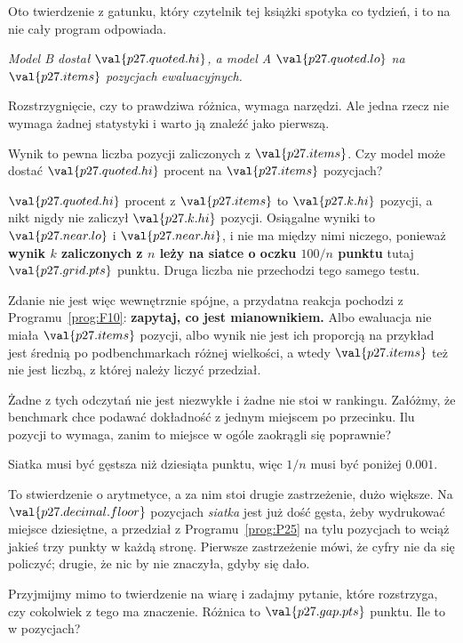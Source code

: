 \begin{fr}
Oto twierdzenie z gatunku, który czytelnik tej książki spotyka co tydzień, i
to na nie cały program odpowiada.

\begin{center}
\emph{Model B dostał $\val{p27.quoted.hi}$, a model A
$\val{p27.quoted.lo}$ na $\val{p27.items}$ pozycjach ewaluacyjnych.}
\end{center}

Rozstrzygnięcie, czy to prawdziwa różnica, wymaga narzędzi. Ale jedna rzecz
nie wymaga żadnej statystyki i warto ją znaleźć jako pierwszą.

Wynik to pewna liczba pozycji zaliczonych z $\val{p27.items}$. Czy model może
dostać $\val{p27.quoted.hi}$ procent na $\val{p27.items}$ pozycjach?
\dotline
\nextframe
\end{fr}

\begin{fr}

$\val{p27.quoted.hi}$ procent z $\val{p27.items}$ to $\val{p27.k.hi}$
pozycji, a nikt nigdy nie zaliczył $\val{p27.k.hi}$ pozycji. Osiągalne wyniki
to $\val{p27.near.lo}$ i $\val{p27.near.hi}$, i nie ma między nimi niczego,
ponieważ \textbf{wynik $k$ zaliczonych z $n$ leży na siatce o oczku
$100/n$ punktu} \dash{} tutaj $\val{p27.grid.pts}$ punktu.
Druga liczba nie przechodzi tego samego testu.

Zdanie nie jest więc wewnętrznie spójne, a przydatna reakcja pochodzi z
Programu~\ref{prog:F10}: \textbf{zapytaj, co jest mianownikiem.} Albo
ewaluacja nie miała $\val{p27.items}$ pozycji, albo wynik nie jest ich
proporcją \dash{} na przykład jest średnią po podbenchmarkach różnej
wielkości, a wtedy $\val{p27.items}$ też nie jest liczbą, z której należy
liczyć przedział.

Żadne z tych odczytań nie jest niezwykłe i żadne nie stoi w rankingu.
Załóżmy, że benchmark chce podawać dokładność z jednym miejscem po przecinku.
Ilu pozycji to wymaga, zanim to miejsce w ogóle zaokrągli się poprawnie?
\dotline
\nextframe
\end{fr}

\begin{fr}

Siatka musi być gęstsza niż dziesiąta punktu, więc $1/n$ musi być
poniżej $\num{0.001}$.

To stwierdzenie o arytmetyce, a za nim stoi drugie zastrzeżenie, dużo
większe. Na $\val{p27.decimal.floor}$ pozycjach \emph{siatka} jest już dość
gęsta, żeby wydrukować miejsce dziesiętne, a przedział z
Programu~\ref{prog:P25} na tylu pozycjach to wciąż jakieś trzy punkty w każdą
stronę. Pierwsze zastrzeżenie mówi, że cyfry nie da się policzyć; drugie, że
nic by nie znaczyła, gdyby się dało.

Przyjmijmy mimo to twierdzenie na wiarę i zadajmy pytanie, które rozstrzyga,
czy cokolwiek z tego ma znaczenie. Różnica to $\val{p27.gap.pts}$ punktu. Ile
to w pozycjach?
\dotline
\nextframe
\end{fr}

